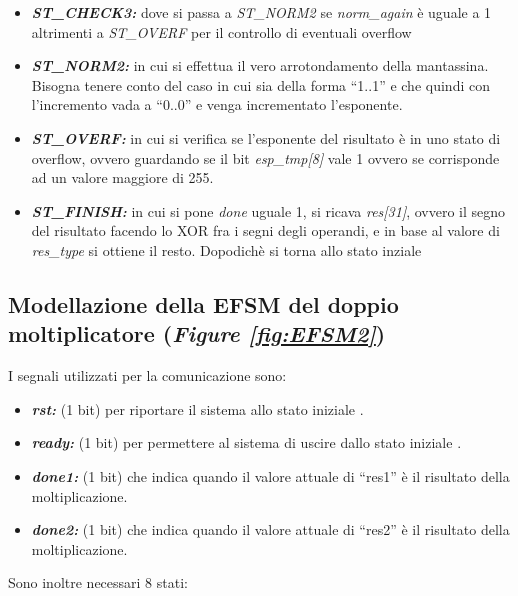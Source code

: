 \documentclass[]{IEEEtran}
\begin{document}
\begin{itemize}
\item {\it\bf ST\_CHECK3:} dove si passa a {\it ST\_NORM2} se {\it norm\_again} è uguale a 1 altrimenti a {\it ST\_OVERF} per il controllo di eventuali overflow
\item {\it\bf ST\_NORM2:} in cui si effettua il vero arrotondamento della mantassina. Bisogna tenere conto del caso in cui sia della forma ``1..1'' e che quindi con l'incremento vada a ``0..0'' e  venga incrementato l'esponente.
\item {\it\bf ST\_OVERF:} in cui si verifica se l'esponente del risultato è in uno stato di overflow, ovvero guardando se il bit {\it esp\_tmp[8]} vale 1 ovvero se corrisponde ad un valore maggiore di 255.
\item {\it\bf ST\_FINISH:} in cui si pone {\it done} uguale 1, si ricava {\it res[31]}, ovvero il segno del risultato facendo lo XOR fra i segni degli operandi, e in base al valore di {\it res\_type} si ottiene il resto. Dopodichè si torna allo stato inziale
\end{itemize}


\subsection{Modellazione della EFSM del doppio moltiplicatore ({\it Figure \ref{fig:EFSM2}})}
I segnali utilizzati per la comunicazione sono:
\begin{itemize}
\item {\it\bf rst:} (1 bit) per riportare il sistema allo stato iniziale .
\item {\it\bf ready:} (1 bit) per permettere al sistema di uscire dallo stato iniziale .
\item {\it\bf done1:} (1 bit) che indica quando il valore attuale di ``res1'' è il risultato della moltiplicazione.
\item {\it\bf done2:} (1 bit) che indica quando il valore attuale di ``res2'' è il risultato della moltiplicazione.
\end{itemize}

Sono inoltre necessari 8 stati:
\end{document}

